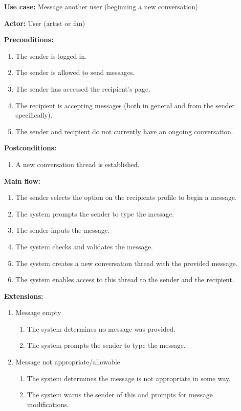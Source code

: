 \documentclass[11pt]{report}
\begin{document}
{\bfseries Use case:} Message another user (beginning a new conversation)

{\bfseries Actor:} User (artist or fan)

{\bfseries Preconditions:}
\begin{enumerate}
	\item The sender is logged in.
	\item The sender is allowed to send messages.
	\item The sender has accessed the recipient's page.
	\item The recipient is accepting messages (both in general and from the sender specifically).
	\item The sender and recipient do not currently have an ongoing conversation.
\end{enumerate}

{\bfseries Postconditions:}
\begin{enumerate}
	\item A new conversation thread is established.
\end{enumerate}

{\bfseries Main flow:}
\begin{enumerate}
	\item The sender selects the option on the recipients profile to begin a message.
	\item The system prompts the sender to type the message.
	\item The sender inputs the message.
	\item The system checks and validates the message.
	\item The system creates a new conversation thread with the provided message.
	\item The system enables access to this thread to the sender and the recipient.
\end{enumerate}

{\bfseries Extensions:}
\begin{enumerate}
	\item [4a.] Message empty
	\begin{enumerate}
		\item [4a1.] The system determines no message was provided.
		\item [4a2.] The system prompts the sender to type the message.
	\end{enumerate}
	\item[4b.] Message not appropriate/allowable
	\begin{enumerate}
		\item [4b1.] The system determines the message is not appropriate in some way.
		\item [4b2.] The system warns the sender of this and prompts for message modifications.
	\end{enumerate}
\end{enumerate}
\end{document}
